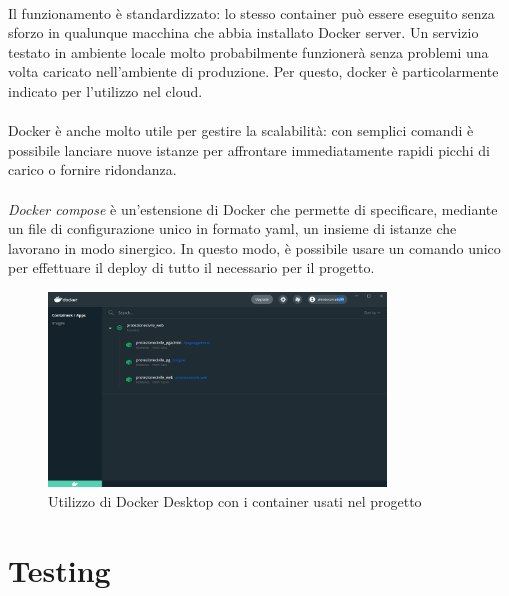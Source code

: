 \documentclass[12pt,a4paper,twoside,english,italian]{book}
\begin{document}
\paragraph{} Il funzionamento è standardizzato: lo stesso container può essere eseguito senza sforzo in qualunque macchina che abbia installato Docker server. Un servizio testato in ambiente locale molto probabilmente funzionerà senza problemi una volta caricato nell'ambiente di produzione. Per questo, docker è particolarmente indicato per l'utilizzo nel cloud. 

\paragraph{} Docker è anche molto utile per gestire la scalabilità: con semplici comandi è possibile lanciare nuove istanze per affrontare immediatamente rapidi picchi di carico o fornire ridondanza. 

\paragraph{} \emph{Docker compose} è un'estensione di Docker che permette di specificare, mediante un file di configurazione unico in formato yaml, un insieme di istanze che lavorano in modo sinergico. In questo modo, è possibile usare un comando unico per effettuare il deploy di tutto il necessario per il progetto.

\begin{figure}[H]
    \centering
    \includegraphics[width=0.8\textwidth]{img/docker.png}
    \caption{Utilizzo di Docker Desktop con i container usati nel progetto}
\end{figure}


\section{Testing}
\end{document}
